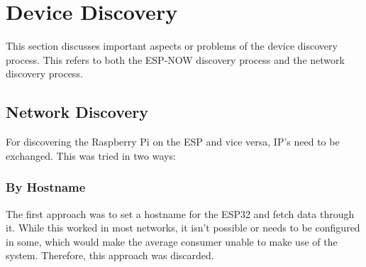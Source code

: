 \section{Device Discovery}
This section discusses important aspects or problems of the device discovery process.
This refers to both the ESP-NOW discovery process and the network discovery process.


    \subsection{Network Discovery} \label{sec:network_discovery}
    For discovering the Raspberry Pi on the ESP and vice versa,
    IP's need to be exchanged. This was tried in two ways:
        \subsubsection{By Hostname}
        The first approach was to set a hostname for the 
        ESP32 and fetch data through it. While this worked
        in most networks, it isn't possible or needs to be
        configured in some, which would make the average 
        consumer unable to make use of the system. 
        Therefore, this approach was discarded.

